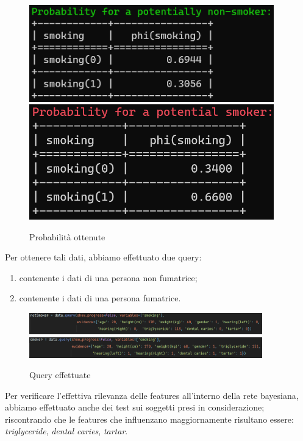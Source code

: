 \documentclass{article}
\begin{document}
\begin{figure}[H]
        \includegraphics[width=10.6cm]{probNotSmoke}
        \includegraphics[width=10.6cm]{probSmoke}
        \centering
        \caption{Probabilità ottenute}
        \centering
\end{figure}

Per ottenere tali dati, abbiamo effettuato due query:
\begin{enumerate}
    \item contenente i dati di una persona non fumatrice;
    \item contenente i dati di una persona fumatrice.
\end{enumerate}
\begin{figure}[H]
        \includegraphics[width=0.9\textwidth]{queryNotSmoke}
        \includegraphics[width=0.9\textwidth]{querySmoke}
        \centering
        \caption{Query effettuate}
        \centering
\end{figure}
%

\noindent
Per verificare l'effettiva rilevanza delle features all'interno della rete bayesiana, abbiamo effettuato anche dei test sui soggetti presi in considerazione; riscontrando  che le features che influenzano maggiornamente risultano essere: \textit{triglyceride}, \textit{dental caries}, \textit{tartar}.   
%
\end{document}
